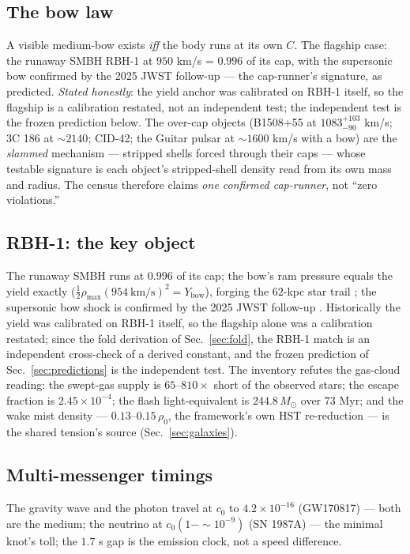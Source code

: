 \documentclass[11pt, a4paper]{article}
\newcommand{\cnot}{\ensuremath{c_0}}
\newcommand{\rhonot}{\ensuremath{\rho_0}}
\newcommand{\rhomax}{\ensuremath{\rho_{\mathrm{max}}}}
\newcommand{\Ybow}{\ensuremath{Y_{\mathrm{bow}}}}
\begin{document}
\subsection{The bow law}
A visible medium-bow exists \emph{iff} the body runs at its own $C$. The flagship
case: the runaway SMBH RBH-1 at $950$ km/s = $0.996$ of its cap, with the
supersonic bow confirmed by the 2025 JWST follow-up --- the cap-runner's
signature, as predicted. \emph{Stated honestly}: the yield anchor was calibrated
on RBH-1 itself, so the flagship is a calibration restated, not an independent
test; the independent test is the frozen prediction below. The over-cap objects
(B1508+55 at $1083^{+103}_{-90}$ km/s; 3C 186 at $\sim2140$; CID-42; the Guitar
pulsar at $\sim1600$ km/s with a bow) are the \emph{slammed} mechanism ---
stripped shells forced through their caps --- whose testable signature is each
object's stripped-shell density read from its own mass and radius. The census
therefore claims \emph{one confirmed cap-runner}, not ``zero violations.''
\label{sec:bowlaw}

\subsection{RBH-1: the key object}
The runaway SMBH runs at $0.996$ of its cap; the bow's ram pressure equals the
yield exactly ($\tfrac12\rhomax(954\ \mathrm{km/s})^2 = \Ybow$), forging the
$62$-kpc star trail \cite{vandokkum2023}; the supersonic bow shock is confirmed
by the 2025 JWST follow-up \cite{vandokkum2025}. Historically the yield was
calibrated on RBH-1 itself, so the flagship alone was a calibration restated;
since the fold derivation of Sec.~\ref{sec:fold}, the RBH-1 match is an
independent cross-check of a derived constant, and the frozen prediction of
Sec.~\ref{sec:predictions} is the independent test. The inventory refutes the
gas-cloud reading: the swept-gas supply is $65$--$810\times$ short of the
observed stars; the escape fraction is $2.45\times10^{-4}$; the flash
light-equivalent is $244.8\,M_\odot$ over $73$ Myr; and the wake mist density ---
$0.13$--$0.15\,\rhonot$, the framework's own HST re-reduction \cite{vandokkum2025}
--- is the shared tension's source (Sec.~\ref{sec:galaxies}).

\subsection{Multi-messenger timings}
The gravity wave and the photon travel at $\cnot$ to $4.2\times10^{-16}$
(GW170817) \cite{ligo2017} --- both are the medium; the neutrino at
$\cnot(1-\sim10^{-9})$ (SN 1987A) --- the minimal knot's toll; the $1.7$ s gap is
the emission clock, not a speed difference.
\end{document}
